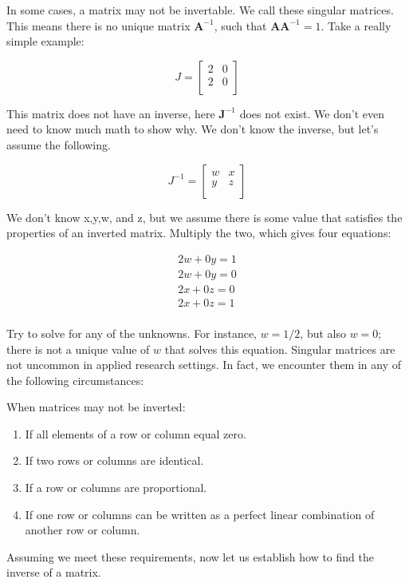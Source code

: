\documentclass[
]{book}
\begin{document}
In some cases, a matrix may not be invertable. We call these
singular matrices. This means there is no unique matrix
\(\textbf{A}^{-1}\), such that \(\textbf{A}\textbf{A}^{-1}=1\). Take a
really simple example:

\[
J=\begin{bmatrix}
2&0\\
2&0\\
\end{bmatrix} 
\]

This matrix does not have an inverse, here \(\textbf{J}^{-1}\) does not
exist. We don't even need to know much math to show why. We don't know
the inverse, but let's assume the following.

\[
J^{-1}=\begin{bmatrix}
w&x\\
y&z\\
\end{bmatrix} 
\]

We don't know x,y,w, and z, but we assume there is some value that
satisfies the properties of an inverted matrix. Multiply the two, which
gives four equations:

\[
\begin{aligned}
2w+0y=1\\
2w+0y=0\\
2x+0z=0\\
2x+0z=1\\
\end{aligned}
\]

Try to solve for any of the unknowns. For instance, \(w=1/2\), but also
\(w=0\); there is not a unique value of \(w\) that solves this equation.
Singular matrices are not uncommon in applied research settings. In
fact, we encounter them in any of the following circumstances:

When matrices may not be inverted:

\begin{enumerate}
\def\labelenumi{(\arabic{enumi})}
\item
  If all elements of a row or column equal zero.
\item
  If two rows or columns are identical.
\item
  If a row or columns are proportional.
\item
  If one row or columns can be written as a perfect linear combination
  of another row or column.
\end{enumerate}

Assuming we meet these requirements, now let us establish how to find
the inverse of a matrix.
\end{document}
